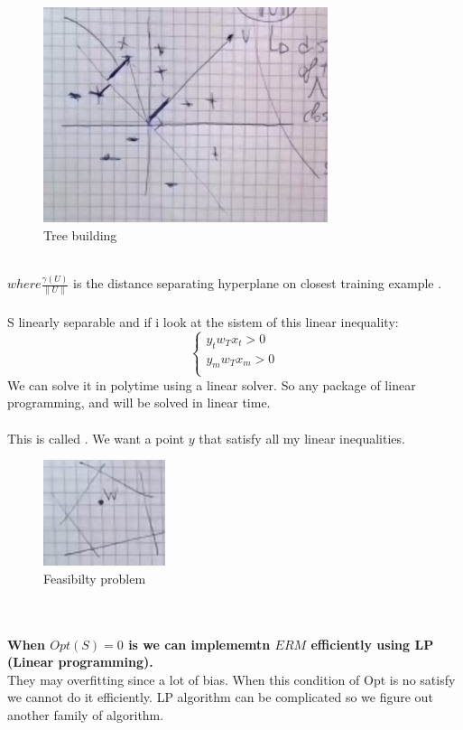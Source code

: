 \documentclass[../main.tex]{subfiles}
\begin{document}
\begin{figure}[h]
    \centering
    \includegraphics[width=0.6\linewidth]{../img/lez13-img3.JPG}
    \caption{Tree building}
\end{figure}\\
$where \frac{\gamma(U)}{\|U\|}$ is the distance separating hyperplane on closest training example .
\\\\
S linearly separable and if i look at the sistem of this linear inequality:
$$
\begin{cases}
y_t w_T x_t > 0 \\
y_m w_T x_m > 0 \\
\end{cases}
$$
We can solve it in polytime using a linear solver. So any package of linear programming, and will be solved in linear time.
\\\\
This is called . We want a point $y$ that satisfy all my linear inequalities.
\\
\begin{figure}[h]
    \centering
    \includegraphics[width=0.2\linewidth]{../img/lez13-img4.JPG}
    \caption{Feasibilty problem}
\end{figure}\\
\\ 
\textbf{When $Opt(S) = 0 $ is  we can implememtn $ERM$ efficiently using LP (Linear programming).} \\They may overfitting since a lot of bias. When this condition of Opt is no satisfy we cannot do it efficiently. 
LP algorithm can be complicated so we figure out another family of algorithm.
\end{document}
